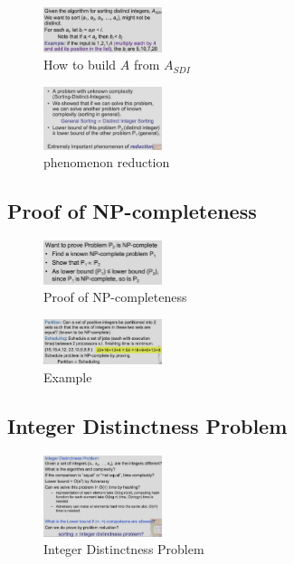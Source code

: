 \begin{figure}[H]
    \centering
    \includegraphics[width=0.309\textwidth]{pic/DAA6/How to build A from ASDI}
    \caption{How to build $A$ from $A_{SDI}$}
\end{figure}


\begin{figure}[H]
    \centering
    \includegraphics[width=0.309\textwidth]{pic/DAA6/phenomenon reduction}
    \caption{phenomenon reduction}
\end{figure}


\subsection{Proof of NP-completeness}

\begin{figure}[H]
    \centering
    \includegraphics[width=0.309\textwidth]{pic/DAA6/Proof of NP-completeness}
    \caption{Proof of NP-completeness}
\end{figure}

\begin{figure}[H]
    \centering
    \includegraphics[width=0.309\textwidth]{pic/DAA6/example np}
    \caption{Example}
\end{figure}



\subsection{Integer Distinctness Problem}
\begin{figure}[H]
    \centering
    \includegraphics[width=0.309\textwidth]{pic/DAA6/Integer Distinctness Problem}
    \caption{Integer Distinctness Problem}
\end{figure}

